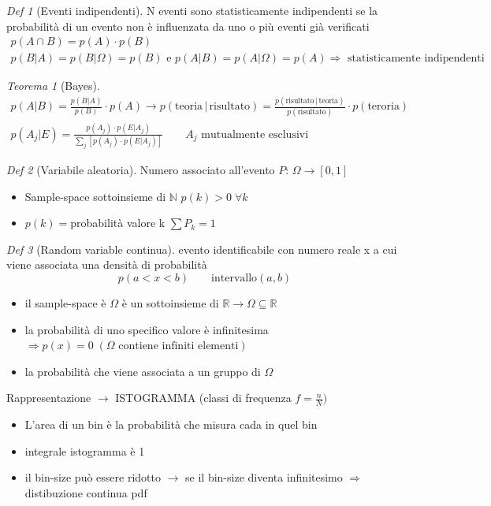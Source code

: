 \documentclass[12pt]{report}
\theoremstyle{remark}
\theoremstyle{theorem}
\newtheorem*{teo}{Teorema}
\newtheorem*{Def}{Def}
\begin{document}
\begin{Def}[Eventi indipendenti]
	N eventi sono statisticamente indipendenti se la probabilità di un evento non è influenzata da uno o più eventi già verificati
	\begin{gather*}
		p(A \cap B) = p(A)\cdot  p(B) \\
		p(B|A) = p(B|\Omega) = p(B) \text{ e } p(A|B) = p(A|\Omega)=p(A) \Rightarrow \text{ statisticamente indipendenti}
	\end{gather*}	
\end{Def}

\begin{teo}[Bayes]
	\begin{gather*}
		p(A|B) = \frac{p(B|A)}{p(B)} \cdot p(A) \to p(\text{teoria}\, |\, \text{risultato}) 
		= \frac{p(\text{risultato}\, | \, \text{teoria})}{p(\text{risultato})} \cdot p(\text{teroria})\\
		p(A_j | E) = \frac{p(A_j)\cdot p(E|A_j)}{\sum_j [p(A_j)\cdot p(E|A_j)]} \qquad \text{$A_j$ mutualmente esclusivi}
	\end{gather*}
\end{teo}

\begin{Def}[Variabile aleatoria]
	Numero associato all'evento \newline
	$P: \, \Omega \to [0,1]$
	\begin{itemize}
		\item Sample-space sottoinsieme di $\mathbb{N}$ \qquad $p(k) > 0 \; \forall k$
		\item $p(k) = $probabilità valore k \qquad $\sum P_k = 1$
	\end{itemize}
\end{Def}

\begin{Def}[Random variable continua]
	evento identificabile con numero reale x a cui viene associata una densità di probabilità
	\[p(a<x<b) \qquad \text{intervallo} (a,b)\]
	\begin{itemize}
		\item il sample-space è $\Omega$ è un sottoinsieme di $\mathbb{R} \to \Omega \subseteq \mathbb{R}$
		\item la probabilità di uno specifico valore è infinitesima $\Rightarrow p(x) = 0 \; (\Omega \text{ contiene infiniti elementi})$
		\item la probabilità che viene associata a un gruppo di $\Omega$ 
	\end{itemize}
	Rappresentazione $\to$ ISTOGRAMMA (classi di frequenza $f = \frac{n}{N})$
	\begin{itemize}
		\item L'area di un bin è la probabilità che misura cada in quel bin
		\item integrale istogramma è 1
		\item il bin-size può essere ridotto $\to$ se il bin-size diventa infinitesimo $\Rightarrow$ distibuzione continua pdf
	\end{itemize}
\end{Def}
\end{document}
